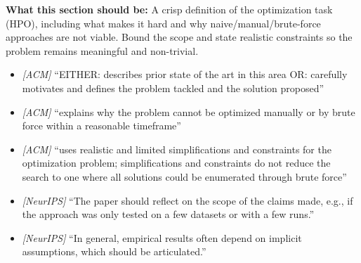 \noindent\textbf{What this section should be:}
A crisp definition of the optimization task (HPO), including what makes it hard and why naive/manual/brute-force approaches are not viable. Bound the scope and state realistic constraints so the problem remains meaningful and non-trivial.
\begin{itemize}
  \item \textit{[ACM]} ``EITHER: describes prior state of the art in this area OR: carefully motivates and defines the problem tackled and the solution proposed''
  \item \textit{[ACM]} ``explains why the problem cannot be optimized manually or by brute force within a reasonable timeframe''
  \item \textit{[ACM]} ``uses realistic and limited simplifications and constraints for the optimization problem; simplifications and constraints do not reduce the search to one where all solutions could be enumerated through brute force''
  \item \textit{[NeurIPS]} ``The paper should reflect on the scope of the claims made, e.g., if the approach was only tested on a few datasets or with a few runs.''
  \item \textit{[NeurIPS]} ``In general, empirical results often depend on implicit assumptions, which should be articulated.''
\end{itemize}